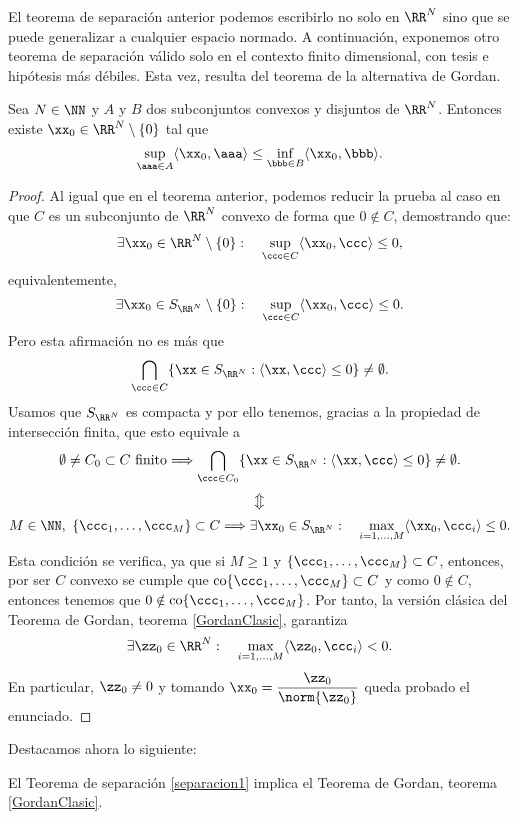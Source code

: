 El teorema de separación anterior podemos escribirlo no solo en $ \RR^N $ sino que se puede generalizar a cualquier espacio normado. A continuación, exponemos otro teorema de separación válido solo en el contexto finito dimensional, con tesis e hipótesis más débiles. Esta vez, resulta del teorema de la alternativa de Gordan.
\bigskip

\begin{teoremaBox}\label{sepDébil}
Sea $ N \in \NN $ y $ A \text{ y } B$ dos subconjuntos convexos y disjuntos de $ \RR^N $. Entonces existe $ \xx_0 \in \RR^N \setminus \{0\} $ tal que
\[
\sup_{\aaa \in A} \langle \xx_0,\aaa\rangle \leq \inf_{\bbb\in B} \langle \xx_0,\bbb\rangle.
\]
\end{teoremaBox}
\begin{proof}
Al igual que en el teorema anterior, podemos reducir la prueba al caso en que $ C $ es un subconjunto de $ \RR^N $ convexo de forma que $ 0 \notin C $, demostrando que:
\[
\exists \xx_0 \in \RR^N \setminus \{0\}: \quad \sup_{\ccc \in C} \langle \xx_0, \ccc \rangle \leq 0,
\]
equivalentemente, 
\[
\exists \xx_0 \in S_{\RR^N} \setminus \{0\}: \quad \sup_{\ccc \in C} \langle \xx_0, \ccc \rangle \leq 0.
\]
Pero esta afirmación no es más que
\[
\bigcap_{\ccc \in C} \{\xx \in S_{\RR^N}: \langle \xx, \ccc \rangle \leq 0 \} \neq \emptyset.
\]
Usamos que $ S_{\RR^N} $ es compacta y por ello tenemos, gracias a la propiedad de intersección finita, que esto equivale a
\[
\emptyset \neq C_0 \subset C \text{ finito} \Longrightarrow \bigcap_{\ccc \in C_0} \{\xx \in S_{\RR^N}: \langle \xx, \ccc \rangle \leq 0 \} \neq \emptyset.
\]
\[
\big\Updownarrow
\]
\[
M \in \NN, \text{ } \{\ccc_1,\dots, \ccc_M\} \subset C\Longrightarrow \exists \xx_0 \in S_{\RR^N}: \quad \max_{i=1,\dots,M} \langle \xx_0, \ccc_i \rangle \leq 0.
\]
Esta condición se verifica, ya que si $ M \geq 1 $ y $ \{\ccc_1,\dots, \ccc_M\} \subset C $, entonces, por ser $ C $ convexo se cumple que $ \mathrm{co}\{\ccc_1,\dots, \ccc_M \} \subset C $ y como $ 0 \notin C $, entonces tenemos que $  0 \notin \mathrm{co}\{\ccc_1,\dots, \ccc_M \} $. Por tanto, la versión clásica del Teorema de Gordan, teorema \ref{GordanClasic}, garantiza
\[
\exists \zz_0 \in \RR^N: \quad \max_{i=1,\dots,M} \langle\zz_0, \ccc_i \rangle < 0.
\]
En particular, $ \zz_0 \neq 0 $ y tomando $ \xx_0 = \displaystyle\frac{\zz_0}{\norm{\zz_0}} $ queda probado el enunciado.
\end{proof}
\bigskip

Destacamos ahora lo siguiente:
\bigskip
\begin{observacion}
El Teorema de separación \ref{separacion1} implica el Teorema de Gordan, teorema \ref{GordanClasic}.
\end{observacion}

